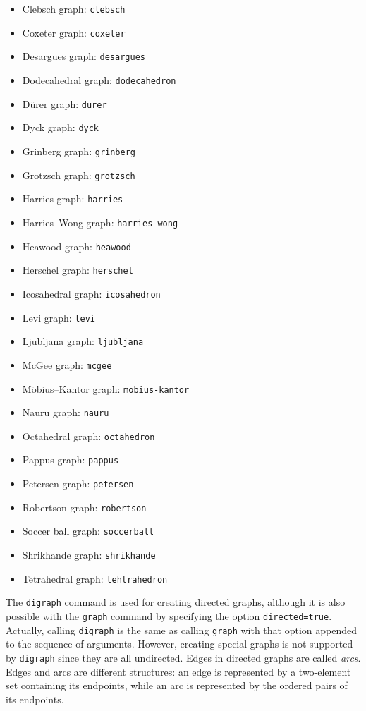 \documentclass[a4paper,11pt]{article}
\begin{document}
\begin{itemize}
  \item Clebsch graph: {\tt clebsch}
  \item Coxeter graph: {\tt coxeter}
  \item Desargues graph: {\tt desargues}
  \item Dodecahedral graph: {\tt dodecahedron}
  \item D\"urer graph: {\tt durer}
  \item Dyck graph: {\tt dyck}
  \item Grinberg graph: {\tt grinberg}
  \item Grotzsch graph: {\tt grotzsch}
  \item Harries graph: {\tt harries}
  \item Harries--Wong graph: {\tt harries-wong}
  \item Heawood graph: {\tt heawood}
  \item Herschel graph: {\tt herschel}
  \item Icosahedral graph: {\tt icosahedron}
  \item Levi graph: {\tt levi}
  \item Ljubljana graph: {\tt ljubljana}
  \item McGee graph: {\tt mcgee}
  \item M\"obius--Kantor graph: {\tt mobius-kantor}
  \item Nauru graph: {\tt nauru}
  \item Octahedral graph: {\tt octahedron}
  \item Pappus graph: {\tt pappus}
  \item Petersen graph: {\tt petersen}
  \item Robertson graph: {\tt robertson}
  \item Soccer ball graph: {\tt soccerball}
  \item Shrikhande graph: {\tt shrikhande}
  \item Tetrahedral graph: {\tt tehtrahedron}
\end{itemize}

The {\tt digraph} command is used for creating directed graphs, although it is also possible with the {\tt graph} command by specifying the option {\tt directed=true}. Actually, calling {\tt digraph} is the same as calling {\tt graph} with that option appended to the sequence of arguments. However, creating special graphs is not supported by {\tt digraph} since they are all undirected. Edges in directed graphs are called \emph{arcs}. Edges and arcs are different structures: an edge is represented by a two-element set containing its endpoints, while an arc is represented by the ordered pairs of its endpoints.
\end{document}
